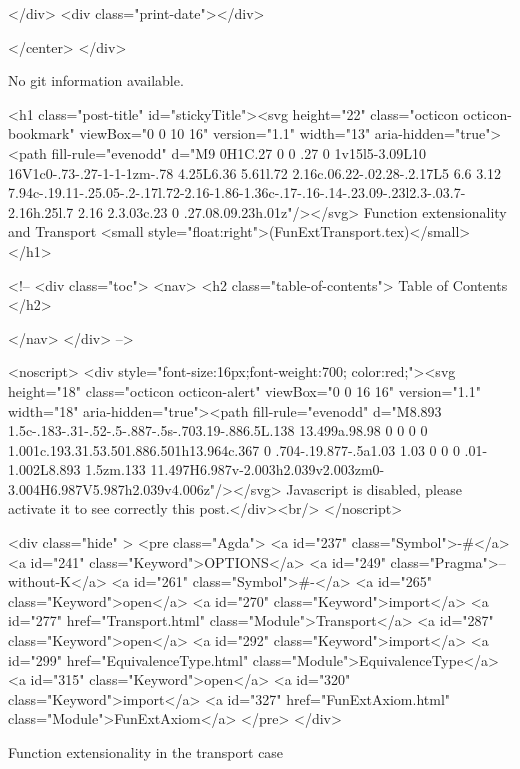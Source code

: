           
        </div>
        <div class="print-date"></div>
        
        
    </center>
  </div>

  
  No git information available.
  

  <h1 class="post-title" id="stickyTitle"><svg height="22" class="octicon octicon-bookmark" viewBox="0 0 10 16" version="1.1" width="13" aria-hidden="true"><path fill-rule="evenodd" d="M9 0H1C.27 0 0 .27 0 1v15l5-3.09L10 16V1c0-.73-.27-1-1-1zm-.78 4.25L6.36 5.61l.72 2.16c.06.22-.02.28-.2.17L5 6.6 3.12 7.94c-.19.11-.25.05-.2-.17l.72-2.16-1.86-1.36c-.17-.16-.14-.23.09-.23l2.3-.03.7-2.16h.25l.7 2.16 2.3.03c.23 0 .27.08.09.23h.01z"/></svg> Function extensionality and Transport <small style="float:right">(FunExtTransport.tex)</small>
  </h1>

  <!-- 
  <div class="toc">
    <nav>
    <h2 class="table-of-contents"> Table of Contents </h2>
      

    </nav>
  </div>
   -->

  <noscript>
  <div style="font-size:16px;font-weight:700; color:red;"><svg height="18" class="octicon octicon-alert" viewBox="0 0 16 16" version="1.1" width="18" aria-hidden="true"><path fill-rule="evenodd" d="M8.893 1.5c-.183-.31-.52-.5-.887-.5s-.703.19-.886.5L.138 13.499a.98.98 0 0 0 0 1.001c.193.31.53.501.886.501h13.964c.367 0 .704-.19.877-.5a1.03 1.03 0 0 0 .01-1.002L8.893 1.5zm.133 11.497H6.987v-2.003h2.039v2.003zm0-3.004H6.987V5.987h2.039v4.006z"/></svg> Javascript is disabled, please activate it to see correctly this post.</div><br/>
  </noscript>

  <div class="hide" >
<pre class="Agda">
<a id="237" class="Symbol">{-#</a> <a id="241" class="Keyword">OPTIONS</a> <a id="249" class="Pragma">--without-K</a> <a id="261" class="Symbol">#-}</a>
<a id="265" class="Keyword">open</a> <a id="270" class="Keyword">import</a> <a id="277" href="Transport.html" class="Module">Transport</a>
<a id="287" class="Keyword">open</a> <a id="292" class="Keyword">import</a> <a id="299" href="EquivalenceType.html" class="Module">EquivalenceType</a>
<a id="315" class="Keyword">open</a> <a id="320" class="Keyword">import</a> <a id="327" href="FunExtAxiom.html" class="Module">FunExtAxiom</a>
</pre>
</div>

Function extensionality in the transport case

